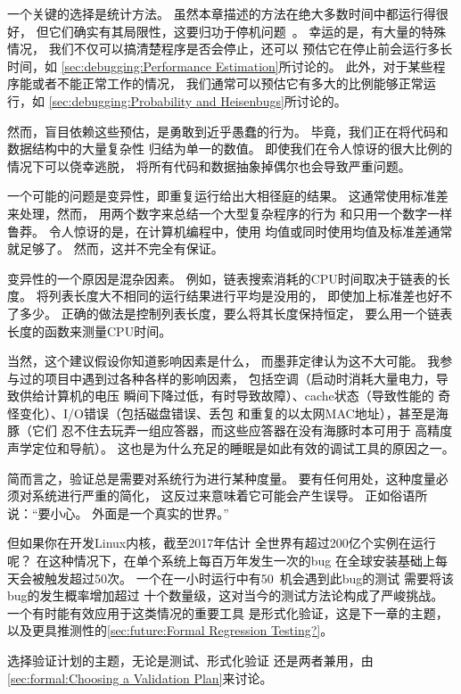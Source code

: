 一个关键的选择是统计方法。
虽然本章描述的方法在绝大多数时间中都运行得很好，
但它们确实有其局限性，这要归功于停机问题~\cite{AlanMTuring1937HaltingProblem,GeoffreyKPullum2000HaltingProblem}。
幸运的是，有大量的特殊情况，
我们不仅可以搞清楚程序是否会停止，还可以
预估它在停止前会运行多长时间，如
\cref{sec:debugging:Performance Estimation}所讨论的。
此外，对于某些程序能或者不能正常工作的情况，
我们通常可以预估它有多大的比例能够正常运行，如
\cref{sec:debugging:Probability and Heisenbugs}所讨论的。

然而，盲目依赖这些预估，是勇敢到近乎愚蠢的行为。
毕竟，我们正在将代码和数据结构中的大量复杂性
归结为单一的数值。
即使我们在令人惊讶的很大比例的情况下可以侥幸逃脱，
将所有代码和数据抽象掉偶尔也会导致严重问题。

一个可能的问题是变异性，即重复运行给出大相径庭的结果。
这通常使用标准差来处理，然而，
用两个数字来总结一个大型复杂程序的行为
和只用一个数字一样鲁莽。
令人惊讶的是，在计算机编程中，使用
均值或同时使用均值及标准差通常就足够了。
然而，这并不完全有保证。

变异性的一个原因是混杂因素。
例如，链表搜索消耗的CPU时间取决于链表的长度。
将列表长度大不相同的运行结果进行平均是没用的，
即使加上标准差也好不了多少。
正确的做法是控制列表长度，要么将其长度保持恒定，
要么用一个链表长度的函数来测量CPU时间。

当然，这个建议假设你知道影响因素是什么，
而墨菲定律认为这不大可能。
我参与过的项目中遇到过各种各样的影响因素，
包括空调（启动时消耗大量电力，导致供给计算机的电压
瞬间下降过低，有时导致故障）、cache状态（导致性能的
奇怪变化）、I/O错误（包括磁盘错误、丢包
和重复的以太网MAC地址），甚至是海豚（它们
忍不住去玩弄一组应答器，而这些应答器在没有海豚时本可用于
高精度声学定位和导航）。
这也是为什么充足的睡眠是如此有效的调试工具的原因之一。

简而言之，验证总是需要对系统行为进行某种度量。
要有任何用处，这种度量必须对系统进行严重的简化，
这反过来意味着它可能会产生误导。
正如俗语所说：``要小心。
外面是一个真实的世界。''

但如果你在开发Linux内核，截至2017年估计
全世界有超过200亿个实例在运行呢？
在这种情况下，在单个系统上每百万年发生一次的bug
在全球安装基础上每天会被触发超过50次。
一个在一小时运行中有50\pct\ 机会遇到此bug的测试
需要将该bug的发生概率增加超过
十个数量级，这对当今的测试方法论构成了严峻挑战。
一个有时能有效应用于这类情况的重要工具
是形式化验证，这是下一章的主题，
以及更具推测性的\cref{sec:future:Formal Regression Testing?}。

选择验证计划的主题，无论是测试、形式化验证
还是两者兼用，由\cref{sec:formal:Choosing a Validation Plan}来讨论。

